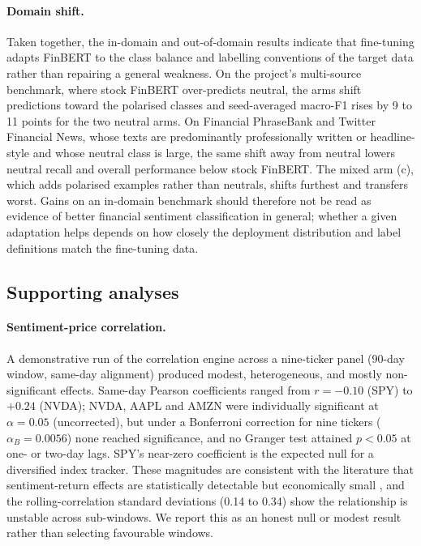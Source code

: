\documentclass{aims}
\numberwithin{equation}{section}
\begin{document}
\paragraph{Domain shift.} Taken together, the in-domain and out-of-domain results
indicate that fine-tuning adapts FinBERT to the class balance and labelling
conventions of the target data rather than repairing a general weakness. On the
project's multi-source benchmark, where stock FinBERT over-predicts neutral, the
arms shift predictions toward the polarised classes and seed-averaged macro-F1
rises by 9 to 11 points for the two neutral arms. On Financial PhraseBank and Twitter Financial News, whose texts are
predominantly professionally written or headline-style and whose neutral class is
large, the same shift away from neutral lowers neutral recall and overall
performance below stock FinBERT. The mixed arm (c), which adds polarised examples
rather than neutrals, shifts furthest and transfers worst. Gains on an in-domain
benchmark should therefore not be read as evidence of better financial sentiment
classification in general; whether a given adaptation helps depends on how closely
the deployment distribution and label definitions match the fine-tuning data.

\subsection{Supporting analyses}
\paragraph{Sentiment-price correlation.}
A demonstrative run of the correlation engine across a nine-ticker panel (90-day
window, same-day alignment) produced modest, heterogeneous, and mostly
non-significant effects. Same-day Pearson coefficients ranged from $r = -0.10$ (SPY)
to $+0.24$ (NVDA); NVDA, AAPL and AMZN were individually significant at
$\alpha = 0.05$ (uncorrected), but under a Bonferroni correction for nine tickers
($\alpha_B = 0.0056$) none reached significance, and no Granger test attained
$p < 0.05$ at one- or two-day lags. SPY's near-zero coefficient is the expected null
for a diversified index tracker. These magnitudes are consistent with the literature
that sentiment-return effects are statistically detectable but economically small
\citep{tetlock2007,kraaijeveld2020}, and the rolling-correlation standard deviations
(0.14 to 0.34) show the relationship is unstable across sub-windows. We report this
as an honest null or modest result rather than selecting favourable windows.
\end{document}
